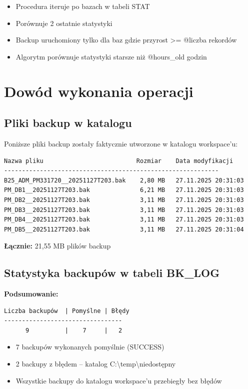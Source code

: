 \documentclass[a4paper,11pt]{article}
\begin{document}
	\begin{itemize}
		\item Procedura iteruje po bazach w tabeli STAT
		\item Porównuje 2 ostatnie statystyki
		\item Backup uruchomiony tylko dla baz gdzie przyrost >= @liczba rekordów
		\item Algorytm porównuje statystyki starsze niż @hours\_old godzin
	\end{itemize}
	
	\section{Dowód wykonania operacji}
	
	\subsection{Pliki backup w katalogu}
	
	Poniższe pliki backup zostały faktycznie utworzone w katalogu workspace'u:
	
	\begin{lstlisting}
Nazwa pliku                          Rozmiar    Data modyfikacji
------------------------------------------------------------
B25_ADM_PM331720__20251127T203.bak    2,80 MB   27.11.2025 20:31:03
PM_DB1__20251127T203.bak              6,21 MB   27.11.2025 20:31:03
PM_DB2__20251127T203.bak              3,11 MB   27.11.2025 20:31:03
PM_DB3__20251127T203.bak              3,11 MB   27.11.2025 20:31:03
PM_DB4__20251127T203.bak              3,11 MB   27.11.2025 20:31:03
PM_DB5__20251127T203.bak              3,11 MB   27.11.2025 20:31:04
	\end{lstlisting}
	
	\textbf{Łącznie:} 21,55 MB plików backup
	
	\subsection{Statystyka backupów w tabeli BK\_LOG}
	
	\textbf{Podsumowanie:}
	\begin{lstlisting}
Liczba backupów  | Pomyślne | Błędy
---------------------------------
      9          |    7     |   2
	\end{lstlisting}
	
	\begin{itemize}
		\item 7 backupów wykonanych pomyślnie (SUCCESS)
		\item 2 backupy z błędem -- katalog C:\textbackslash temp\textbackslash niedostępny
		\item Wszystkie backupy do katalogu workspace'u przebiegły bez błędów
	\end{itemize}
	
\end{document}
